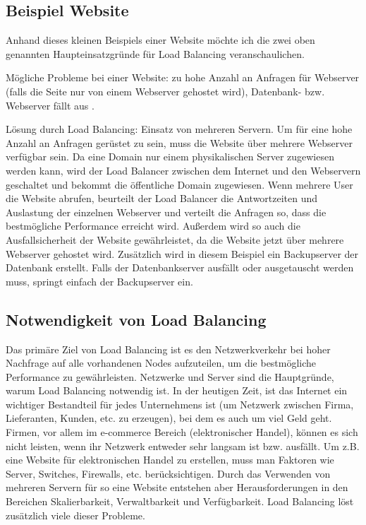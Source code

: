 \subsection{Beispiel Website}
\label{sec:Beispiel Website}
Anhand dieses kleinen Beispiels einer Website möchte ich die zwei oben genannten Haupteinsatzgründe für Load Balancing veranschaulichen. 

Mögliche Probleme bei einer Website: zu hohe Anzahl an Anfragen für Webserver (falls die Seite nur von einem Webserver gehostet wird), Datenbank- bzw. Webserver fällt aus  .

Lösung durch Load Balancing: Einsatz von mehreren Servern. Um für eine hohe Anzahl an Anfragen gerüstet zu sein, muss die Website über mehrere Webserver verfügbar sein. Da eine Domain nur einem physikalischen Server zugewiesen werden kann, wird der Load Balancer zwischen dem Internet und den Webservern geschaltet und bekommt die öffentliche Domain zugewiesen. Wenn mehrere User die Website abrufen, beurteilt der Load Balancer die Antwortzeiten und Auslastung der einzelnen Webserver und verteilt die Anfragen so, dass die bestmögliche Performance erreicht wird. Außerdem wird so auch die Ausfallsicherheit der Website gewährleistet, da die Website jetzt über mehrere Webserver gehostet wird. Zusätzlich wird in diesem Beispiel ein Backupserver der Datenbank erstellt. Falls der Datenbankserver ausfällt oder ausgetauscht werden muss, springt einfach der Backupserver ein.      

\subsection{Notwendigkeit von Load Balancing}
\label{sec:Notwendigkeit von Load Balancing}
Das primäre Ziel von Load Balancing ist es den Netzwerkverkehr bei hoher Nachfrage auf alle vorhandenen Nodes aufzuteilen, um die bestmögliche Performance zu gewährleisten. Netzwerke und Server sind die Hauptgründe, warum Load Balancing notwendig ist. In der heutigen Zeit, ist das Internet ein wichtiger Bestandteil für jedes Unternehmens ist (um Netzwerk zwischen Firma, Lieferanten, Kunden, etc. zu erzeugen), bei dem es auch um viel Geld geht. Firmen, vor allem im e-commerce Bereich (elektronischer Handel), können es sich nicht leisten, wenn ihr Netzwerk entweder sehr langsam ist bzw. ausfällt. 
Um z.B. eine Website für elektronischen Handel zu erstellen, muss man Faktoren wie Server, Switches, Firewalls, etc. berücksichtigen. Durch das Verwenden von mehreren Servern für so eine Website entstehen aber Herausforderungen in den Bereichen Skalierbarkeit, Verwaltbarkeit und Verfügbarkeit. Load Balancing löst zusätzlich viele dieser Probleme.

